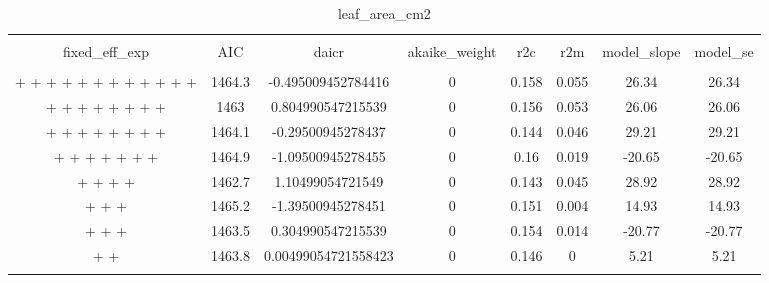 
\begin{table}[!htbp] \centering 
  \caption{leaf_area_cm2} 
  \label{leaf_area_cm2} 
\begin{tabular}{@{\extracolsep{5pt}} cccccccc} 
\\[-1.8ex]\hline 
\hline \\[-1.8ex] 
fixed\_eff\_exp & AIC & daicr & akaike\_weight & r2c & r2m & model\_slope & model\_se \\ 
\hline \\[-1.8ex] 
 +  +  +  +  +  +  +  +  +  +  +  +  & 1464.3 & -0.495009452784416 & 0 & 0.158 & 0.055 & 26.34 & 26.34 \\ 
 +  +  +  +  +  +  +  +  & 1463 & 0.804990547215539 & 0 & 0.156 & 0.053 & 26.06 & 26.06 \\ 
 +  +  +  +  +  +  +  +  & 1464.1 & -0.29500945278437 & 0 & 0.144 & 0.046 & 29.21 & 29.21 \\ 
 +  +  +  +  +  +  +  & 1464.9 & -1.09500945278455 & 0 & 0.16 & 0.019 & -20.65 & -20.65 \\ 
 +  +  +  +  & 1462.7 & 1.10499054721549 & 0 & 0.143 & 0.045 & 28.92 & 28.92 \\ 
 +  +  +  & 1465.2 & -1.39500945278451 & 0 & 0.151 & 0.004 & 14.93 & 14.93 \\ 
 +  +  +  & 1463.5 & 0.304990547215539 & 0 & 0.154 & 0.014 & -20.77 & -20.77 \\ 
 +  +  & 1463.8 & 0.00499054721558423 & 0 & 0.146 & 0 & 5.21 & 5.21 \\ 
\hline \\[-1.8ex] 
\end{tabular} 
\end{table} 
